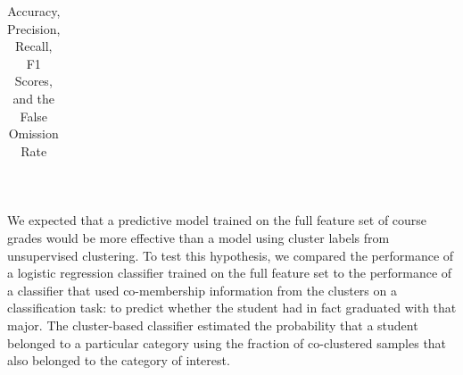 \documentclass{sigchi}
\begin{document}
\begin{table}[h]
\begin{tabular}{ccccccc}
\end{tabular}
\caption{Accuracy, Precision, Recall, F1 Scores, and the False Omission Rate}~\label{tab:scoresTable}

\end{table}

We expected that a predictive model trained on the full feature set of course grades would be more effective than a model using cluster labels from unsupervised clustering. To test this hypothesis, we compared the performance of a logistic regression classifier trained on the full feature set to the performance of a classifier that used co-membership information from the clusters on a classification task: to predict whether the student had in fact graduated with that major. The cluster-based classifier estimated the probability that a student belonged to a particular category using the fraction of co-clustered samples that also belonged to the category of interest.
\end{document}
